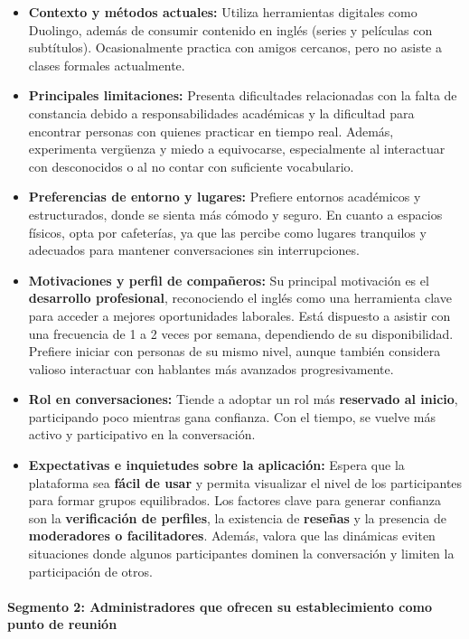 \begin{itemize}
\tightlist
\item
  \textbf{Contexto y métodos actuales:} Utiliza herramientas digitales
  como Duolingo, además de consumir contenido en inglés (series y
  películas con subtítulos). Ocasionalmente practica con amigos
  cercanos, pero no asiste a clases formales actualmente.
\item
  \textbf{Principales limitaciones:} Presenta dificultades relacionadas
  con la falta de constancia debido a responsabilidades académicas y la
  dificultad para encontrar personas con quienes practicar en tiempo
  real. Además, experimenta vergüenza y miedo a equivocarse,
  especialmente al interactuar con desconocidos o al no contar con
  suficiente vocabulario.
\item
  \textbf{Preferencias de entorno y lugares:} Prefiere entornos
  académicos y estructurados, donde se sienta más cómodo y seguro. En
  cuanto a espacios físicos, opta por cafeterías, ya que las percibe
  como lugares tranquilos y adecuados para mantener conversaciones sin
  interrupciones.
\item
  \textbf{Motivaciones y perfil de compañeros:} Su principal motivación
  es el \textbf{desarrollo profesional}, reconociendo el inglés como una
  herramienta clave para acceder a mejores oportunidades laborales. Está
  dispuesto a asistir con una frecuencia de 1 a 2 veces por semana,
  dependiendo de su disponibilidad. Prefiere iniciar con personas de su
  mismo nivel, aunque también considera valioso interactuar con
  hablantes más avanzados progresivamente.
\item
  \textbf{Rol en conversaciones:} Tiende a adoptar un rol más
  \textbf{reservado al inicio}, participando poco mientras gana
  confianza. Con el tiempo, se vuelve más activo y participativo en la
  conversación.
\item
  \textbf{Expectativas e inquietudes sobre la aplicación:} Espera que la
  plataforma sea \textbf{fácil de usar} y permita visualizar el nivel de
  los participantes para formar grupos equilibrados. Los factores clave
  para generar confianza son la \textbf{verificación de perfiles}, la
  existencia de \textbf{reseñas} y la presencia de \textbf{moderadores o
  facilitadores}. Además, valora que las dinámicas eviten situaciones
  donde algunos participantes dominen la conversación y limiten la
  participación de otros.
\end{itemize}

\paragraph{Segmento 2: Administradores que ofrecen su establecimiento
como punto de
reunión}\label{report__20-cap2-requirements-analysis.md__segmento-2-administradores-que-ofrecen-su-establecimiento-como-punto-de-reuniuxf3n}

